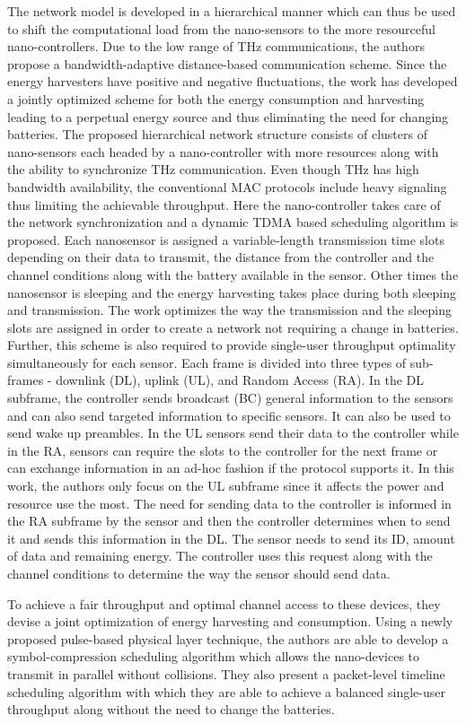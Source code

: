 \documentclass[12pt, letterpaper]{article}
\begin{document}
\par
The network model is developed in a hierarchical manner which can thus be used to shift the computational load from the nano-sensors to the more resourceful nano-controllers. Due to the low range of THz communications, the authors propose a bandwidth-adaptive distance-based communication scheme. Since the energy harvesters have positive and negative fluctuations, the work has developed a jointly optimized scheme for both the energy consumption and harvesting leading to a perpetual energy source and thus eliminating the need for changing batteries. The proposed hierarchical network structure consists of clusters of nano-sensors each headed by a nano-controller with more resources along with the ability to synchronize THz communication. Even though THz has high bandwidth availability, the conventional MAC protocols include heavy signaling thus limiting the achievable throughput. Here the nano-controller takes care of the network synchronization and a dynamic TDMA based scheduling algorithm is proposed. Each nanosensor is assigned a variable-length transmission time slots depending on their data to transmit, the distance from the controller and the channel conditions along with the battery available in the sensor. Other times the nanosensor is sleeping and the energy harvesting takes place during both sleeping and transmission. The work optimizes the way the transmission and the sleeping slots are assigned in order to create a network not requiring a change in batteries. Further, this scheme is also required to provide single-user throughput optimality simultaneously for each sensor. Each frame is divided into three types of sub-frames - downlink (DL), uplink (UL), and Random Access (RA). In the DL subframe, the controller sends broadcast (BC) general information to the sensors and can also send targeted information to specific sensors. It can also be used to send wake up preambles. In the UL sensors send their data to the controller while in the RA, sensors can require the slots to the controller for the next frame or can exchange information in an ad-hoc fashion if the protocol supports it. In this work, the authors only focus on the UL subframe since it affects the power and resource use the most. The need for sending data to the controller is informed in the RA subframe by the sensor and then the controller determines when to send it and sends this information in the DL. The sensor needs to send its ID, amount of data and remaining energy. The controller uses this request along with the channel conditions to determine the way the sensor should send data.
\par
To achieve a fair throughput and optimal channel access to these devices, they devise a joint optimization of energy harvesting and consumption. Using a newly proposed pulse-based physical layer technique, the authors are able to develop a symbol-compression scheduling algorithm which allows the nano-devices to transmit in parallel without collisions. They also present a packet-level timeline scheduling algorithm with which they are able to achieve a balanced single-user throughput along without the need to change the batteries.

 

\end{document}
